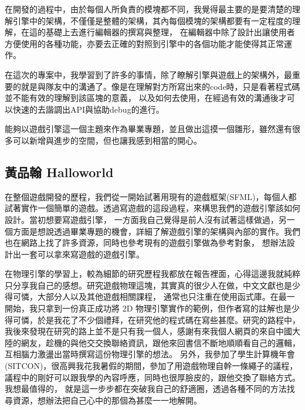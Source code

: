 在開發的過程中，由於每個人所負責的模塊都不同，我覺得最主要的是要清楚的理解引擎中的架構，不僅僅是整體的架構，其內每個模塊的架構都要有一定程度的理解，在這的基礎上去進行編輯器的撰寫與整理，
在編輯器中除了設計出讓使用者方便使用的各種功能，亦要去正確的對照到引擎中的各個功能才能使得其正常運作。

在這次的專案中，我學習到了許多的事情，除了瞭解引擎與遊戲上的架構外，最重要的就是與隊友中的溝通了。像是在理解對方所寫出來的code時，只是看著程式碼並不能有效的理解到該區塊的意義，
以及如何去使用，在經過有效的溝通後才可以快速的去諧調出API與協助debug的進行。

能夠以遊戲引擎這一個主題來作為畢業專題，並且做出這摸一個雛形，雖然還有很多可以新增與進步的空間，但也讓我感到相當的開心。

\subsection{黃品翰 Halloworld}
\label{sec:Halloworld}

在整個遊戲開發的歷程，我們從一開始試著用現有的遊戲框架(SFML)，每個人都試著實作一個簡單的遊戲。透過寫遊戲的這段過程，來構思我們的遊戲引擎該如何設計。當初想要寫遊戲引擎，
一方面我自己覺得是前人沒有試著這樣做過，另一個方面是想說透過畢業專題的機會，詳細了解遊戲引擎的架構與內部的實作。我們也在網路上找了許多資源，同時也參考現有的遊戲引擎做為參考對象，
想辦法設計出一套可以拿來寫遊戲的遊戲引擎。

在物理引擎的學習上，較為細節的研究歷程我都放在報告裡面，心得這邊我就純粹只分享我自己的感想。研究遊戲物理這塊，其實真的很少人在做，中文文獻也是少得可憐，大部分人以及其他遊戲相關課程，
通常也只注重在使用函式庫。在最一開始，我只拿到一份真正成功將 2D 物理引擎實作的範例，但作者寫的註解也是少得可憐，於是我花了不少個禮拜，在研究他的程式碼在寫些甚麼。研究的路程中，
我後來發現在研究的路上並不是只有我一個人，感謝有來我個人網頁的來自中國大陸的網友，趁機的與他交交換聯絡資訊，跟他來回書信不斷地順順看自己的邏輯，互相腦力激盪出當時撰寫這份物理引擎的想法。
另外，我參加了學生計算機年會(SITCON)，很高興我花我暑假的期間，參加了用遊戲物理自幹一條繩子的議程，議程中的剛好可以跟我學的內容呼應，同時也很厚臉皮的，跟他交換了聯絡方式。我想最值得的，
就是這一步步都在突破我自己的舒適圈，透過各種不同的方法找尋資源，想辦法把自己心中的那個為甚麼一一地解開。

